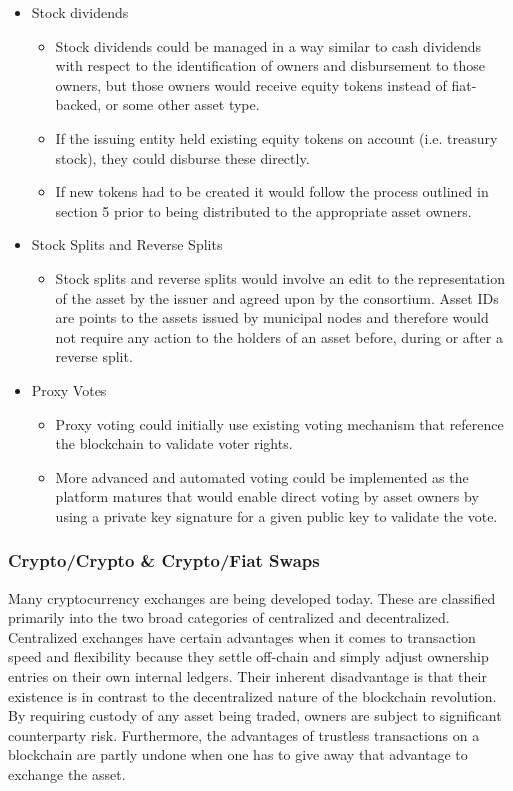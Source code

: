 \documentclass[12pt]{article}
\begin{document}
	\begin{itemize}
		\item{Stock dividends}
			\begin{itemize}
				\item{Stock dividends could be managed in a way similar to cash 
					dividends with respect to the identification of owners and 
					disbursement to those owners, but those owners would receive 
					equity tokens instead of fiat-backed, or some other asset type. }
				\item{If the issuing entity held existing equity tokens on account 
					(i.e. treasury stock), they could disburse these directly.}
				\item{If new tokens had to be created it would follow the process outlined 
					in section 5 prior to being distributed to the appropriate asset owners.}
			\end{itemize}
		\item{Stock Splits and Reverse Splits}
			\begin{itemize}
				\item{Stock splits and 
				reverse splits would involve an edit to the representation of the asset by the issuer
					and agreed upon by the consortium.  Asset IDs are points to the assets issued by municipal
					nodes and therefore would not require any action to the holders of an asset before, during or 
					after a reverse split.}
			\end{itemize}
		\item{Proxy Votes}
			\begin{itemize}
				\item{Proxy voting could initially use existing voting mechanism that reference 
					the blockchain to validate voter rights.}
				\item{More advanced and automated voting could be implemented as the platform 
					matures that would enable direct voting by asset owners by using a private 
					key signature for a given public key to validate the vote.}
			\end{itemize}
	\end{itemize}
\subsubsection{Crypto/Crypto \& Crypto/Fiat Swaps}
Many cryptocurrency exchanges are being developed today. These are classified primarily into the two broad categories of 
centralized and decentralized. Centralized exchanges have certain advantages when it comes to transaction speed and 
flexibility because they settle off-chain and simply adjust ownership entries on their own internal ledgers. Their 
inherent disadvantage is that their existence is in contrast to the decentralized nature of the blockchain revolution.
By requiring custody of any asset being traded, owners are subject to significant counterparty risk. Furthermore, the 
advantages of trustless transactions on a blockchain are partly undone when one has to give away that advantage to exchange 
the asset.
\end{document}
